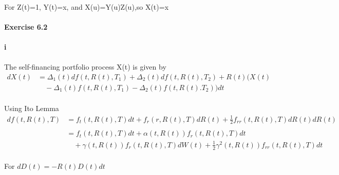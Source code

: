 \documentclass{article}
\begin{document}
\paragraph{}{For Z(t)=1, Y(t)=x, and X(u)=Y(u)Z(u),so X(t)=x}
\paragraph{Exercise 6.2}{}
\paragraph{i}
\paragraph{}{The self-financing portfolio process X(t) is given by}
\begin{align*}
  dX(t) & =\Delta_1(t)df(t,R(t),T_1)+\Delta_2(t)df(t,R(t),T_2)+R(t)(X(t)\\
  &\quad -\Delta_1(t)f(t,R(t),T_1)-\Delta_2(t)f(t,R(t).T_2))dt
\end{align*}
\paragraph{}{Using Ito Lemma}
\begin{align*}
  df(t,R(t),T) & =f_t(t,R(t),T)dt+f_r(r,R(t),T)dR(t)+\frac{1}{2}f_{rr}(t,R(t),T)dR(t)dR(t)\\ \\
   &=f_t(t,R(t),T)dt+\alpha(t,R(t))f_r(t,R(t),T)dt\\
   &\quad +\gamma(t,R(t))f_r(t,R(t),T)dW(t)+\frac{1}{2}\gamma^2(t,R(t))f_{rr}(t,R(t),T)dt
\end{align*}
\paragraph{}{For $dD(t)=-R(t)D(t)dt$}
\end{document}
